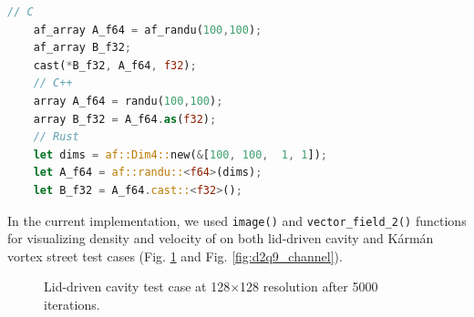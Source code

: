 \begin{lstlisting}[language=Rust, caption={Converting to single precision floating point for Forge visualization in C, C++ and Rust}, label=forge-cast-f32]
	// C
	af_array A_f64 = af_randu(100,100);
	af_array B_f32;
	cast(*B_f32, A_f64, f32);
	// C++
	array A_f64 = randu(100,100);
	array B_f32 = A_f64.as(f32);
	// Rust
	let dims = af::Dim4::new(&[100, 100,  1, 1]);
	let A_f64 = af::randu::<f64>(dims);
	let B_f32 = A_f64.cast::<f32>();
\end{lstlisting}

In the current implementation, we used \texttt{image()} and \texttt{vector_field_2()} functions for visualizing density and velocity of on both lid-driven cavity and Kármán vortex street test cases (Fig. \ref{fig:d2q9_lid} and Fig. \ref{fig:d2q9_channel}).

\begin{figure}[!ht]
	\centering
	\qquad
	\captionsetup{justification=centering}
	\caption{Lid-driven cavity test case at 128$\times$128 resolution after 5000 iterations.}
	\label{fig:d2q9_lid}
\end{figure}

